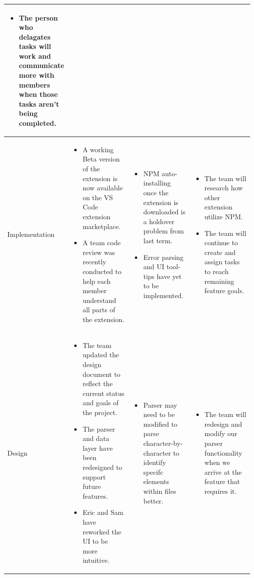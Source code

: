 \documentclass[letterpaper,10pt,titlepage,draftclsnofoot,onecolumn,onesided] {IEEEtran}
\begin{document}
\begin{center}
\begin{singlespace}
\begin{tabular}{ |  p{0.25\linewidth}  |  p{0.25\linewidth}  | p{0.25\linewidth} | p{0.25\linewidth} |}
\begin{itemize}
				\item The person who delagates tasks will work and communicate more with members when those tasks aren't being completed.
			\end{itemize} 
		\\ \hline
			Implementation 
		& 
			\begin{itemize}
				\item A working Beta version of the extension is now available on the VS Code extension marketplace.
				\item A team code review was recently conducted to help each member understand all parts of the extension.
			\end{itemize}
		& 
			\begin{itemize}
				\item NPM auto-installing once the extension is downloaded is a holdover problem from last term.
				\item Error parsing and UI tool-tips have yet to be implemented.
			\end{itemize}
		&
			\begin{itemize}
				\item The team will research how other extension utilize NPM.
				\item The team will continue to create and assign tasks to reach remaining feature goals.
			\end{itemize} 
		\\ \hline
			Design 
		& 
			\begin{itemize}
				\item The team updated the design document to reflect the current status and goals of the project.
				\item The parser and data layer have been redesigned to support future features.
				\item Eric and Sam have reworked the UI to be more intuitive.
			\end{itemize}
		& 
			\begin{itemize}
				\item Parser may need to be modified to parse character-by-character to identify specifc elements within files better.
			\end{itemize}
		&
			\begin{itemize}
				\item The team will redesign and modify our parser functionality when we arrive at the feature that requires it.
			\end{itemize} 
		\\ \hline

\end{tabular}
\end{singlespace}
\end{center}
\end{document}
